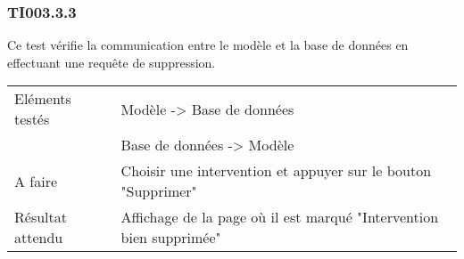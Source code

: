   		
  	\subsubsection{TI003.3.3}
  	\label{TI003.3.3}
  		Ce test vérifie la communication entre le modèle et la base de données en effectuant une requête de suppression.
  		\begin{center}
    	 		\begin{tabular}[h]{|p{}|p{}|}
			\hline
				Eléments testés & Modèle -> Base de données  \\
							    &  Base de données -> Modèle \\\hline
    				A faire & Choisir une intervention et appuyer sur le bouton "Supprimer" \\\hline
    				Résultat attendu & Affichage de la page où il est marqué "Intervention bien supprimée"  \\\hline
     		\end{tabular}
  		\end{center}	
  	
  		
